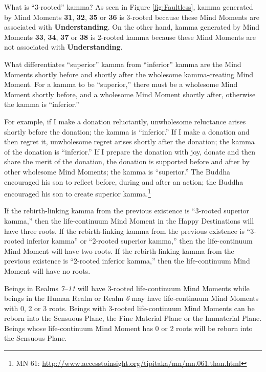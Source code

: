 What is “3-rooted” kamma? As seen in Figure \ref{fig:Faultless}, kamma generated by Mind Moments \textbf{31}, \textbf{32}, \textbf{35} or \textbf{36} is 3-rooted because these Mind Moments are associated with \textbf{Understanding}. On the other hand, kamma generated by Mind Moments \textbf{33}, \textbf{34}, \textbf{37} or \textbf{38} is 2-rooted kamma because these Mind Moments are not associated with \textbf{Understanding}.

What differentiates “superior” kamma from “inferior” kamma are the Mind Moments shortly before and shortly after the wholesome kamma-creating Mind Moment. For a kamma to be “superior,” there must be a wholesome Mind Moment shortly before, and a wholesome Mind Moment shortly after, otherwise the kamma is “inferior.” 

\pagebreak

For example, if I make a donation reluctantly, unwholesome reluctance arises shortly before the donation; the kamma is “inferior.” If I make a donation and then regret it, unwholesome regret arises shortly after the donation; the kamma of the donation is “inferior.” If I prepare the donation with joy, donate and then share the merit of the donation, the donation is supported before and after by other wholesome Mind Moments; the kamma is “superior.” The Buddha encouraged his son to reflect before, during and after an action; the Buddha encouraged his son to create superior kamma.\footnote{MN 61: \url{http://www.accesstoinsight.org/tipitaka/mn/mn.061.than.html}}

If the rebirth-linking kamma from the previous existence is “3-rooted superior kamma,” then the life-continuum Mind Moment in the Happy Destinations will have three roots. If the rebirth-linking kamma from the previous existence is “3-rooted inferior kamma” or “2-rooted superior kamma,” then the life-continuum Mind Moment will have two roots. If the rebirth-linking kamma from the previous existence is “2-rooted inferior kamma,” then the life-continuum Mind Moment will have no roots.

Beings in Realms \textit{7}--\textit{11} will have 3-rooted life-continuum Mind Moments while beings in the Human Realm or Realm \textit{6} may have life-continuum Mind Moments with 0, 2 or 3 roots. Beings with 3-rooted life-continuum Mind Moments can be reborn into the Sensuous Plane, the Fine Material Plane or the Immaterial Plane. Beings whose life-continuum Mind Moment has 0 or 2 roots will be reborn into the Sensuous Plane.

